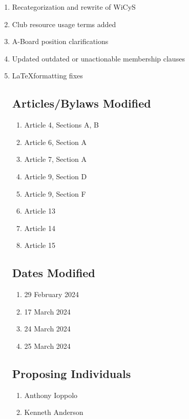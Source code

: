 \begin{enumerate}
      \item Recategorization and rewrite of WiCyS
      \item Club resource usage terms added
      \item A-Board position clarifications
      \item Updated outdated or unactionable membership clauses
      \item \LaTeX\space formatting fixes

            \subsection{Articles/Bylaws Modified}
            \begin{enumerate}
                  \item Article 4, Sections A, B 
                  \item Article 6, Section A
                  \item Article 7, Section A
                  \item Article 9, Section D
                  \item Article 9, Section F
                  \item Article 13
                  \item Article 14
                  \item Article 15
            \end{enumerate}

            \subsection{Dates Modified}
            \begin{enumerate}
                  \item 29 February 2024
                  \item 17 March 2024
                  \item 24 March 2024
                  \item 25 March 2024
            \end{enumerate}

            \subsection{Proposing Individuals}
            \begin{enumerate}
                  \item Anthony Ioppolo
                  \item Kenneth Anderson
            \end{enumerate}
\end{enumerate}